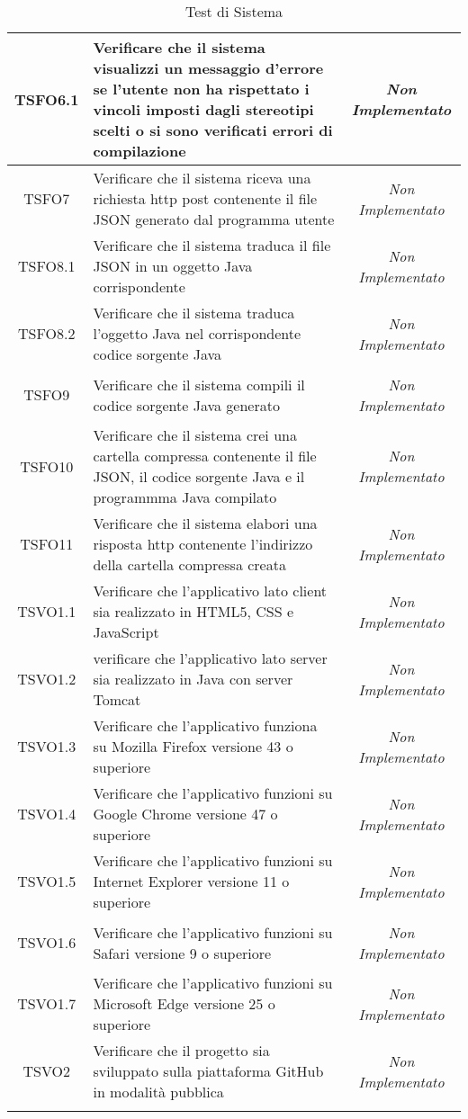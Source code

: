 \begin{longtable}{|c|>{}m{8cm}|c|}
\hypertarget{TSFO6.1}{TSFO6.1} & Verificare che il sistema visualizzi un messaggio d’errore se l’utente non ha rispettato i vincoli imposti dagli stereotipi scelti o si sono verificati errori di compilazione & \textit{Non Implementato}\\ \hline
\hypertarget{TSFO7}{TSFO7} & Verificare che il sistema riceva una richiesta http post contenente il file JSON generato dal programma utente & \textit{Non Implementato}\\ \hline
\hypertarget{TSFO8.1}{TSFO8.1} & Verificare che il sistema traduca il file JSON in un oggetto Java corrispondente & \textit{Non Implementato}\\ \hline
\hypertarget{TSFO8.2}{TSFO8.2} & Verificare che il sistema traduca l'oggetto Java nel corrispondente codice sorgente Java & \textit{Non Implementato}\\ \hline
\hypertarget{TSFO9}{TSFO9} & Verificare che il sistema compili il codice sorgente Java generato & \textit{Non Implementato}\\ \hline
\hypertarget{TSFO10}{TSFO10} & Verificare che il sistema crei una cartella compressa contenente il file JSON, il codice sorgente Java e il programmma Java compilato  & \textit{Non Implementato}\\ \hline
\hypertarget{TSFO11}{TSFO11} & Verificare che il sistema elabori una risposta http contenente l'indirizzo della cartella compressa creata & \textit{Non Implementato}\\ \hline
\hypertarget{TSVO1.1}{TSVO1.1} & Verificare che l'applicativo lato client sia realizzato in HTML5, CSS e JavaScript & \textit{Non Implementato}\\ \hline
\hypertarget{TSVO1.2}{TSVO1.2} & verificare che l’applicativo lato server sia realizzato in Java con server Tomcat & \textit{Non Implementato}\\ \hline
\hypertarget{TSVO1.3}{TSVO1.3} & Verificare che l’applicativo funziona su Mozilla Firefox versione 43 o superiore & \textit{Non Implementato}\\ \hline
\hypertarget{TSVO1.4}{TSVO1.4} & Verificare che l’applicativo funzioni su Google Chrome versione 47 o superiore & \textit{Non Implementato}\\ \hline
\hypertarget{TSVO1.5}{TSVO1.5} & Verificare che l’applicativo funzioni su Internet Explorer versione 11 o superiore & \textit{Non Implementato}\\ \hline
\hypertarget{TSVO1.6}{TSVO1.6} & Verificare che l’applicativo funzioni su Safari versione 9 o superiore & \textit{Non Implementato}\\ \hline
\hypertarget{TSVO1.7}{TSVO1.7} & Verificare che l’applicativo funzioni su Microsoft Edge versione 25 o superiore & \textit{Non Implementato}\\ \hline
\hypertarget{TSVO2}{TSVO2} & Verificare che il progetto sia sviluppato sulla piattaforma GitHub in modalità pubblica & \textit{Non Implementato}\\ \hline
\caption[Test di Sistema]{Test di Sistema}
\label{tabella:test1}
\end{longtable}
\clearpage

